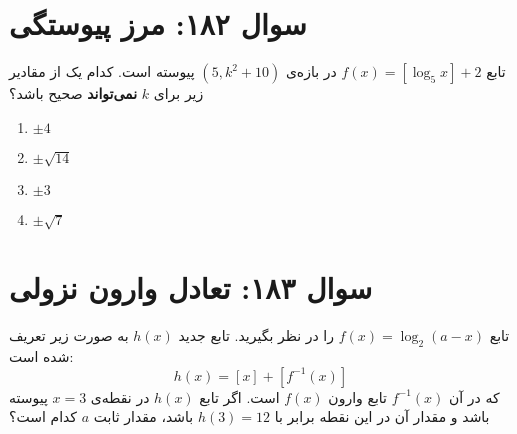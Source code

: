 \documentclass[12pt]{article}
\begin{document}
\vspace{1cm}
\hrulefill
\vspace{1cm}

\section*{سوال ۱۸۲: مرز پیوستگی}
تابع \( f(x) = [\log_5 x] + 2 \) در بازه‌ی \( (5, k^2+10) \) پیوسته است. کدام یک از مقادیر زیر برای \(k\) \textbf{نمی‌تواند} صحیح باشد؟
\begin{enumerate}[label=(\arabic*)]
	\item \( \pm 4 \)
	\item \( \pm \sqrt{14} \)
	\item \( \pm 3 \)
	\item \( \pm \sqrt{7} \)
\end{enumerate}

\vspace{1cm}
\hrulefill
\vspace{1cm}

\section*{سوال ۱۸۳: تعادل وارون نزولی}
تابع \(f(x) = \log_2(a-x)\) را در نظر بگیرید. تابع جدید \(h(x)\) به صورت زیر تعریف شده است:
\begin{displaymath}
	h(x) = [x] + [f^{-1}(x)]
\end{displaymath}
که در آن \(f^{-1}(x)\) تابع وارون \(f(x)\) است. اگر تابع \(h(x)\) در نقطه‌ی \(x=3\) پیوسته باشد و مقدار آن در این نقطه برابر با \(h(3)=12\) باشد، مقدار ثابت \(a\) کدام است؟
\end{document}
